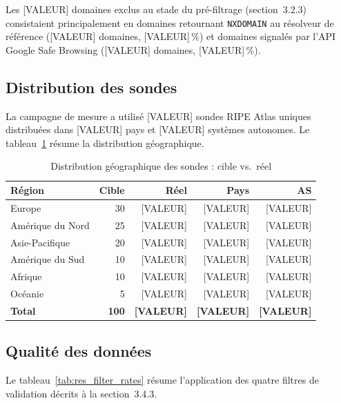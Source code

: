 Les [VALEUR] domaines exclus au stade du pré-filtrage (section~3.2.3) consistaient principalement en domaines retournant \texttt{NXDOMAIN} au résolveur de référence ([VALEUR] domaines, [VALEUR]\,\%) et domaines signalés par l'API Google Safe Browsing ([VALEUR] domaines, [VALEUR]\,\%).

\subsection{Distribution des sondes}
\label{subsec:4.1.2}

La campagne de mesure a utilisé [VALEUR] sondes RIPE Atlas uniques distribuées dans [VALEUR] pays et [VALEUR] systèmes autonomes. Le tableau~\ref{tab:probe_distribution} résume la distribution géographique.

\begin{table}[H]
\centering
\small
\begin{tabularx}{\linewidth}{X r r r r}
\toprule
\textbf{Région} & \textbf{Cible} & \textbf{Réel} & \textbf{Pays} & \textbf{AS} \\
\midrule
Europe & 30 & [VALEUR] & [VALEUR] & [VALEUR] \\
Amérique du Nord & 25 & [VALEUR] & [VALEUR] & [VALEUR] \\
Asie-Pacifique & 20 & [VALEUR] & [VALEUR] & [VALEUR] \\
Amérique du Sud & 10 & [VALEUR] & [VALEUR] & [VALEUR] \\
Afrique & 10 & [VALEUR] & [VALEUR] & [VALEUR] \\
Océanie & 5 & [VALEUR] & [VALEUR] & [VALEUR] \\
\textbf{Total} & \textbf{100} & \textbf{[VALEUR]} & \textbf{[VALEUR]} & \textbf{[VALEUR]} \\
\bottomrule
\end{tabularx}
\caption{Distribution géographique des sondes : cible vs.\ réel}
\label{tab:probe_distribution}
\end{table}

\subsection{Qualité des données}
\label{subsec:4.1.3}

Le tableau~\ref{tab:res_filter_rates} résume l'application des quatre filtres de validation décrits à la section~3.4.3.

